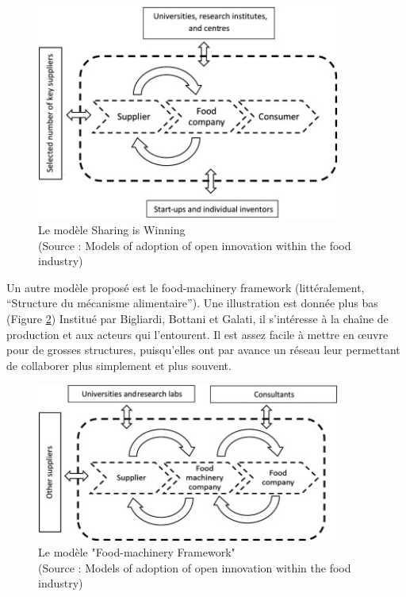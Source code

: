 \documentclass[a4paper,12pt]{report}
\begin{document}
			\begin{figure}[!h]
			\centering
			\includegraphics[width=10cm]{Illustrations/Schema_SIW.jpg}
			\caption{Le modèle Sharing is Winning \\(Source : Models of adoption of open innovation within the food industry\cite{OpenInnovation})}
			\label{ImageSiW}
			\end{figure}
			
			Un autre modèle proposé est le food-machinery framework (littéralement, “Structure du mécanisme alimentaire”). Une illustration est donnée plus bas (Figure \ref{ImageFMF}) Institué par Bigliardi, Bottani et Galati, il s’intéresse à la chaîne de production et aux acteurs qui l’entourent\cite{FMF}. Il est assez facile à mettre en œuvre pour de grosses structures, puisqu’elles ont par avance un réseau leur permettant de collaborer plus simplement et plus souvent.
			
			\begin{figure}[!h]
			\centering
			\includegraphics[width=10cm]{Illustrations/Schema_FMF.jpg}
			\caption{Le modèle "Food-machinery Framework" \\(Source : Models of adoption of open innovation within the food industry\cite{OpenInnovation})}
			\label{ImageFMF}
			\end{figure}
			
\end{document}
